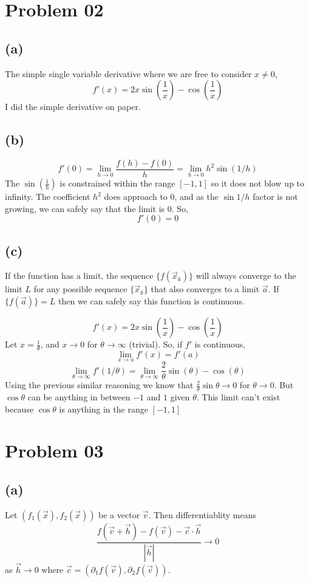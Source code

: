 \documentclass[letter]{article}
\begin{document}
\section*{Problem 02} 
\subsection*{(a)}
The simple single variable derivative where we are free to consider $x \neq 0$, 
\[
f'(x) = 2x \sin\left(\frac{1}{x}\right) - \cos \left(\frac{1}{x}\right)
\] 
I did the simple derivative on paper. 

\subsection*{(b)} 
\[
f'(0) = \lim_{h \to 0} \frac{f(h) - f(0)}{h} = 
\lim_{h \to 0} h^2 \sin (1 / h)
\]
The $\sin (\frac{1}{h}) $ is constrained within the range $[-1,1]$ so it does not blow up to infinity. The coefficient $h^2$ does approach to $0$, and as the $\sin 1 / h$ factor is not growing, we can safely say that the limit is $0$. So, 
\[
f'(0) = 0
\] 

\subsection*{(c)} 
If the function has a limit, the sequence $\{f(\vec{x}_k)\} $ will always converge to the limit $L$ for any possible sequence $\{\vec{x}_k\} $ that also converges to a limit $\vec{a}$. If $\{f(\vec{a})\} = L $ then we can safely say this function is continuous. 

\[
f'(x) = 2x \sin \left(\frac{1}{x}\right) - \cos \left(\frac{1}{x}\right)
\] 
Let $x = \frac{1}{\theta }$, and $x \to 0$ for $\theta \to  \infty$ (trivial). So, if $f'$ is continuous, 
\[
\lim_{x \to a} f'(x) = f'(a)
\]
\[
\lim_{\theta \to \infty} f'(1 / \theta) = \lim_{\theta \to \infty}  \frac{2}{\theta} \sin\left(\theta\right) - \cos \left(\theta\right)
\]
Using the previous similar reasoning we know that $\frac{2}{\theta} \sin \theta \to 0$ for $\theta \to 0$. But $\cos \theta$ can be anything in between $-1$ and $1$ given $\theta$. This limit can't exist because $\cos \theta$ is anything in the range $[-1,1]$ 

\section*{Problem 03} 

\subsection*{(a)}
Let $(f_1(\vec{x}) , f_2(\vec{x})) $ be a vector $\vec{v}$. Then differentiablity means 
\[
\frac{f(\vec{v}+\vec{h}) - f(\vec{v}) - \vec{c}\cdot \vec{h}}{|\vec{h}|} \to  0 
\] 
as $\vec{h} \to  0$ where $\vec{c} = \left(\partial_1 f(\vec{v}), \partial_2f(\vec{v})\right)$. 
\end{document}
